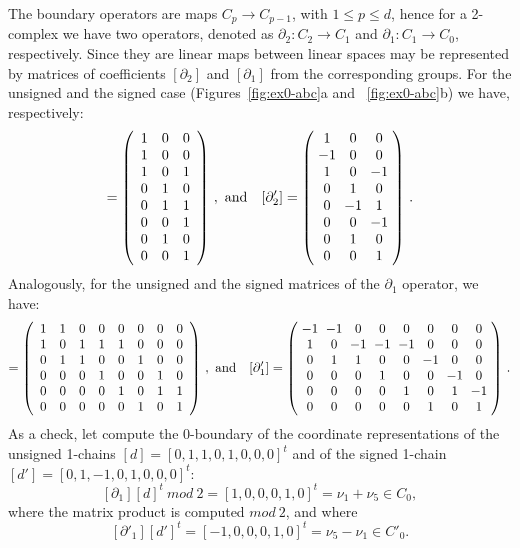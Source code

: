 {
\begin{example}[Boundary]\label{exampled}
The boundary operators are maps $C_p\to C_{p-1}$, with $1\leq p\leq d$, hence for a 2-complex we have two operators, denoted as $\partial_2: C_2 \to C_1$ and $\partial_1: C_1 \to C_0$, respectively. 
Since they are linear maps between linear spaces may be represented by matrices of coefficients $[\partial_2]$ and $[\partial_1]$ from the corresponding groups. For the unsigned and the signed case (Figures~\ref{fig:ex0-abc}a and ~\ref{fig:ex0-abc}b) we have, respectively:
\begin{equation}
[\partial_2] = \mat{
1 & 0 & 0\\
1 & 0 & 0\\
1 & 0 & 1\\
0 & 1 & 0\\
0 & 1 & 1\\
0 & 0 & 1\\
0 & 1 & 0\\
0 & 0 & 1\\
}\ ,
\ \mbox{{and}}\quad
\arraycolsep=2.9pt%
[\partial'_2] = \mat{
1 & 0 & 0\\
-1 & 0 & 0\\
1 & 0 & -1\\
0 & 1 & 0\\
0 & -1 & 1\\
0 & 0 & -1\\
0 & 1 & 0\\
0 & 0 & 1\\
}\ .
\label{eq:delta2}
\end{equation}
Analogously, for the unsigned and the signed matrices of the $\partial_1$ operator, we have: 
\begin{equation}
[\partial_1] = \mat{
1 & 1 & 0 & 0 & 0 & 0 & 0 & 0\\
1 & 0 & 1 & 1 & 1 & 0 & 0 & 0\\
0 & 1 & 1 & 0 & 0 & 1 & 0 & 0\\
0 & 0 & 0 & 1 & 0 & 0 & 1 & 0\\
0 & 0 & 0 & 0 & 1 & 0 & 1 & 1\\
0 & 0 & 0 & 0 & 0 & 1 & 0 & 1\\
}\ ,
\ \mbox{{and}}\quad
\arraycolsep=2.9pt%
[\partial'_1] = \mat{
-1 & -1 & 0 & 0 & 0 & 0 & 0 & 0\\
1 & 0 & -1 & -1 & -1 & 0 & 0 & 0\\
0 & 1 & 1 & 0 & 0 & -1 & 0 & 0\\
0 & 0 & 0 & 1 & 0 & 0 & -1 & 0\\
0 & 0 & 0 & 0 & 1 & 0 & 1 & -1\\
0 & 0 & 0 & 0 & 0 & 1 & 0 & 1\\
}\ .
\label{eq:delta1}
\end{equation}
As a check, let compute the 0-boundary of the coordinate representations of the unsigned 1-chains $[d] = [0,1,1,0,1,0,0,0]^t$ and {of} the signed 1-chain $[d'] = [0,1,-1,0,1,0,0,0]^t$:
\[
[\partial_1][d]^t\ {mod\ 2} = [1,0,0,0,1,0]^t = \nu_1 + \nu_5 \in C_0,
\]
where the matrix product is computed $mod\ 2$, and where
\[
[\partial'_1][d']^t = [-1,0,0,0,1,0]^t = \nu_5 - \nu_1 \in C'_0.
\]
\end{example}
}


